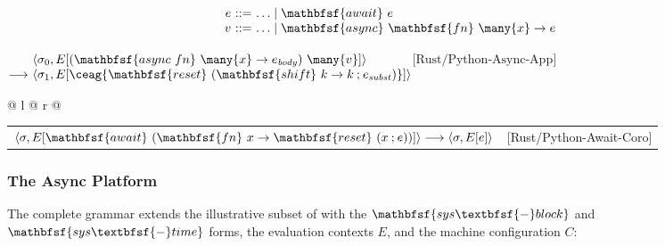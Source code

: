 $$
\begin{array}{r@{\ }c@{\ }l}
e & ::= & \ldots \mid \mathbfsf{await}\ e \\
v & ::= & \ldots \mid \mathbfsf{async}\ \mathbfsf{fn}\ \many{x} \to e
\end{array}
$$

\noindent
$\begin{array}[t]{@{}r@{\ }l@{}}
                & \langle \sigma_0, E[(\mathbfsf{async\ fn}\ \many{x} \to e_{\mathit{body}})\ \many{v}] \rangle \\
\longrightarrow & \langle \sigma_1, E[\ceag{\mathbfsf{reset}\ (\mathbfsf{shift}\ k \to k \mathbin{;} e_{\mathit{subst}})}] \rangle
\end{array}$\hfill$\text{[Rust/Python-Async-App]}$\par
\noindent
\begin{tabular*}{\linewidth}{@{} l @{\extracolsep{\fill}} r @{}}
\end{tabular*}

\vspace{1em}
\noindent
\begin{tabular*}{\linewidth}{@{} l @{\extracolsep{\fill}} r @{}}
$\langle \sigma, E[\mathbfsf{await}\ (\mathbfsf{fn}\ x \to \mathbfsf{reset}\ (x \mathbin{;} e))] \rangle \longrightarrow \langle \sigma, E[e] \rangle$ & [Rust/Python-Await-Coro]
\end{tabular*}
\vspace{0.7em}

\subsubsection{The Async Platform \lasync}\label{app:semantics:platform}

The complete \lasync grammar extends the illustrative subset of  with the $\mathbfsf{sys\textbfsf{-}block}$ and $\mathbfsf{sys\textbfsf{-}time}$ forms, the evaluation contexts $E$, and the machine configuration $C$:

